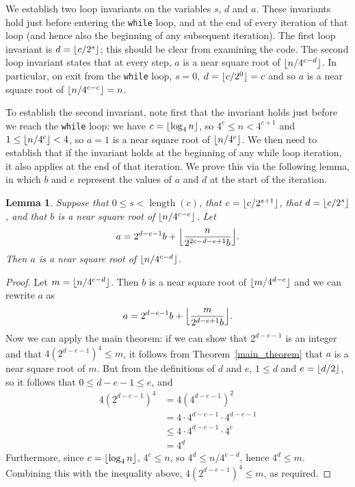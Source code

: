 \documentclass[a4paper]{article}
\DeclarePairedDelimiter\floor{\lfloor}{\rfloor}
\DeclareMathOperator{\length}{length}
\theoremstyle{plain}
\newtheorem{lemma}[theorem]{Lemma}
\theoremstyle{definition}
\begin{document}
We establish two loop invariants on the variables $s$, $d$ and $a$. These
invariants hold just before entering the \lstinline$while$ loop, and at the end
of every iteration of that loop (and hence also the beginning of any subsequent
iteration). The first loop invariant is $d = \floor{c/2^s}$; this should be
clear from examining the code. The second loop invariant states that at every
step, $a$ is a near square root of $\floor{n / 4^{c-d}}$. In particular, on exit
from the \lstinline$while$ loop, $s = 0$, $d = \floor{c/2^0} = c$ and so $a$ is
a near square root of $\floor{n / 4^{c-c}} = n$.

To establish the second invariant, note first that the invariant holds just
before we reach the \lstinline$while$ loop: we have $c = \floor{\log_4 n}$, so
$4^c \le n < 4^{c+1}$ and $1 \le \floor{n / 4^c} < 4$, so $a = 1$ is a near
square root of $\floor{n / 4^c}$. We then need to establish that if the
invariant holds at the beginning of any while loop iteration, it also applies
at the end of that iteration. We prove this via the following lemma, in which
$b$ and $e$ represent the values of $a$ and $d$ at the start of the iteration.

\begin{lemma}
  Suppose that $0 \le s < \length(c)$, that $e = \floor{c / 2^{s + 1}}$, that $d =
  \floor{c / 2^s}$, and that $b$ is a near square root of $\floor{n /
  4^{c-e}}$. Let
  $$a = 2^{d-e-1}b + \floor*{\frac{n}{2^{2c-d-e+1}b}}.$$ Then $a$ is a near
  square root of $\floor{n / 4^{c-d}}$.
\end{lemma}

\begin{proof}
  Let $m = \floor{n / 4^{c-d}}$. Then $b$ is a near square root of
  $\floor{m/4^{d-e}}$ and we can rewrite $a$ as
  $$a = 2^{d-e-1}b + \floor*{\frac{m}{2^{d-e+1}b}}.$$ Now we can apply the main
  theorem: if we can show that $2^{d-e-1}$ is an integer and that
  $4(2^{d-e-1})^4 \le m$, it follows from Theorem~\ref{main_theorem} that $a$
  is a near square root of $m$. But from the definitions of $d$ and $e$, $1 \le
  d$ and $e = \floor{d/2}$, so it follows that $0 \le d - e - 1 \le e$, and
  \begin{align*}
    4(2^{d-e-1})^4 &= 4(4^{d-e-1})^2 \\
                  &= 4\cdot 4^{d-e-1}\cdot 4^{d-e-1} \\
                  &\le 4\cdot 4^{d-e-1}\cdot 4^e \\
                  &= 4^d
  \end{align*}
  Furthermore, since $c = \floor{\log_4 n}$, $4^c \le n$, so $4^d \le n /
  4^{c-d}$, hence $4^d \le m$. Combining this with the inequality above,
  $4(2^{d-e-1})^4 \le m$, as required.
\end{proof}
\end{document}
